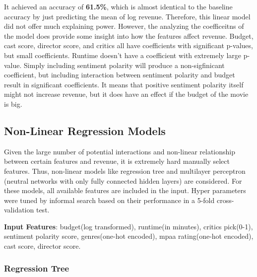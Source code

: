 \documentclass[11pt]{article}
\begin{document}
It achieved an accuracy of \textbf{61.5\%}, which is almost identical to
the baseline accuracy by just predicting the mean of log revenue.
Therefore, this linear model did not offer much explaining power.
However, the analyzing the coefficeitns of the model does provide some
insight into how the features affect revenue. Budget, cast score,
director score, and critics all have coefficients with significant
p-values, but small coefficients. Runtime doesn't have a coefficient
with extremely large p-value. Simply including sentiment polarity will
produce a non-sigfinicant coefficient, but including interaction between
sentiment polarity and budget result in significant coefficients. It
means that positive sentiment polarity itself might not increase
revenue, but it does have an effect if the budget of the movie is big.

    \subsection{Non-Linear Regression
Models}\label{non-linear-regression-models}

Given the large number of potential interactions and non-linear
relationship between certain features and revenue, it is extremely hard
manually select features. Thus, non-linear models like regression tree
and multilayer perceptron (neutral networks with only fully connected
hidden layers) are considered. For these models, all available features
are included in the input. Hyper parameters were tuned by informal
search based on their performance in a 5-fold cross-validation test.

\textbf{Input Features}: budget(log transformed), runtime(in minutes),
critics pick(0-1), sentiment polarity score, genres(one-hot encoded),
mpaa rating(one-hot encoded), cast score, director score.

\subsubsection{Regression Tree}\label{regression-tree}
\end{document}

